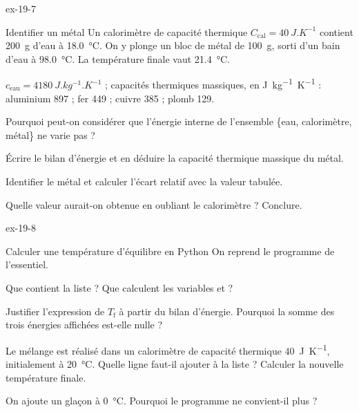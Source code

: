 \begin{blocLivre}{ex-19-7}
\begin{exercice}[2]{Identifier un métal}
Un calorimètre de capacité thermique $C_\mathrm{cal}=\qty{40}{J.K^{-1}}$ contient \qty{200}{g} d'eau à \qty{18,0}{\degreeCelsius}. On y
plonge un bloc de métal de \qty{100}{g}, sorti d'un bain d'eau à \qty{98,0}{\degreeCelsius}. La température finale vaut
\qty{21,4}{\degreeCelsius}.
\begin{donnees}
$c_\mathrm{eau}=\qty{4180}{J.kg^{-1}.K^{-1}}$ ; capacités thermiques massiques, en \unit{J.kg^{-1}.K^{-1}} : aluminium 897 ; fer 449 ;
cuivre 385 ; plomb 129.
\end{donnees}
\begin{questions}
\item Pourquoi peut-on considérer que l'énergie interne de l'ensemble \{eau, calorimètre, métal\} ne varie pas ?
\item Écrire le bilan d'énergie et en déduire la capacité thermique massique du métal.
\item Identifier le métal et calculer l'écart relatif avec la valeur tabulée.
\item Quelle valeur aurait-on obtenue en oubliant le calorimètre ? Conclure.
\end{questions}
\end{exercice}
\end{blocLivre}
\begin{blocLivre}{ex-19-8}
\begin{exercice}[2]{Calculer une température d'équilibre en Python}
On reprend le programme de l'essentiel.
\begin{questions}
\item {}Que contient la liste  ? Que calculent les variables  et  ?
\item Justifier l'expression de $T_\mathrm{f}$ à partir du bilan d'énergie. Pourquoi la somme des trois énergies affichées
est-elle nulle ?
\item Le mélange est réalisé dans un calorimètre de capacité thermique \qty{40}{J.K^{-1}}, initialement à \qty{20}{\degreeCelsius}.
Quelle ligne faut-il ajouter à la liste ? Calculer la nouvelle température finale.
\item On ajoute un glaçon à \qty{0}{\degreeCelsius}. Pourquoi le programme ne convient-il plus ?
\end{questions}
\end{exercice}
\end{blocLivre}
